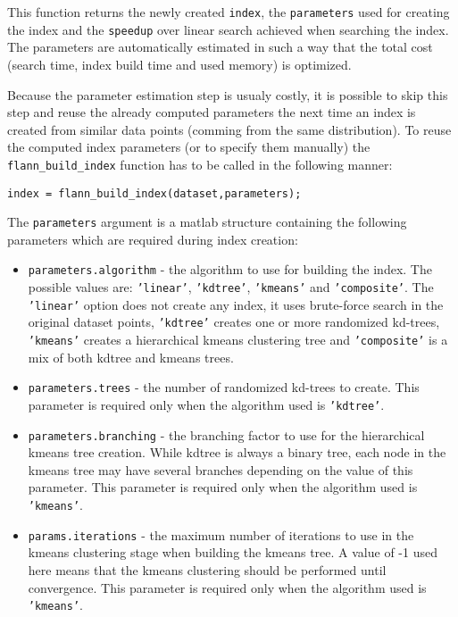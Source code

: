 \documentclass[letter,10pt]{article}
\begin{document}
This function returns the newly created \texttt{index}, the \texttt{parameters} used for creating the index and the \texttt{speedup} over linear search achieved when searching the index. The parameters are automatically estimated in such a way that the total cost (search time, index build time and used memory) is optimized. 

Because the parameter estimation step is usualy costly, it is possible to skip this step and reuse the already computed parameters the next time an index is created from similar data points (comming from the same distribution). To reuse the computed index parameters (or to specify them manually) the \texttt{flann\_build\_index} function has to be called in the following manner:


\begin{Verbatim}
index = flann_build_index(dataset,parameters);
\end{Verbatim}

 The \texttt{parameters} argument is a matlab structure containing the following parameters which are required during index creation:
\begin{itemize}
	\item \texttt{parameters.algorithm} - the algorithm to use for building the index. The possible values are: \texttt{'linear'}, \texttt{'kdtree'}, \texttt{'kmeans'} and \texttt{'composite'}. The \texttt{'linear'} option does not create any index, it uses brute-force search in the original dataset points, \texttt{'kdtree'} creates one or more randomized kd-trees, \texttt{'kmeans'} creates a hierarchical kmeans clustering tree and \texttt{'composite'} is a mix of both kdtree and kmeans trees.
	
	\item \texttt{parameters.trees} - the number of randomized kd-trees to create. This parameter is required only when the algorithm used is \texttt{'kdtree'}.
	
	\item \texttt{parameters.branching} - the branching factor to use for the hierarchical kmeans tree creation. While kdtree is always a binary tree, each node in the kmeans tree may have several branches depending on the value of this parameter. This parameter is required only when the algorithm used is \texttt{'kmeans'}.
	
	\item \texttt{params.iterations} - the maximum number of iterations to use in the kmeans clustering stage when building the kmeans tree. A value of -1 used here means that the kmeans clustering should be performed until convergence. This parameter is required only when the algorithm used is \texttt{'kmeans'}.
\end{itemize}
\end{document}
